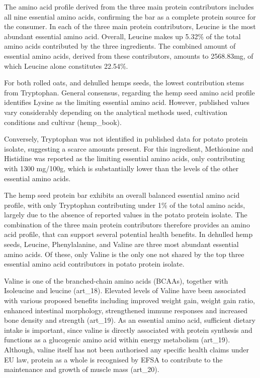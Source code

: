 \vspace{1em}
The amino acid profile derived from the three main protein contributors includes all nine essential amino acids, confirming the bar as a complete protein source for the consumer. In each of the three main protein contributors, Leucine is the most abundant essential amino acid. Overall, Leucine makes up 5.32\% of the total amino acids contributed by the three ingredients. The combined amount of essential amino acids, derived from these contributors, amounts to 2568.83mg, of which Leucine alone constitutes 22.54\%.

\vspace{1em}
For both rolled oats, and dehulled hemps seeds, the lowest contribution stems from Tryptophan. General consensus, regarding the hemp seed amino acid profile identifies Lysine as the limiting essential amino acid. However, published values vary considerably depending on the analytical methods used, cultivation conditions and cultivar (hemp\_book). 

\vspace{1em}
Conversely, Tryptophan was not identified in published data for potato protein isolate, suggesting a scarce amounts present. For this ingredient, Methionine and Histidine was reported as the limiting essential amino acids, only contributing with 1300 mg/100g, which is substantially lower than the levels of the other essential amino acids. 

\vspace{1em}
The hemp seed protein bar exhibits an overall balanced essential amino acid profile, with only Tryptophan contributing under 1\% of the total amino acids, largely due to the absence of reported values in the potato protein isolate. The combination of the three main protein contributors therefore provides an amino acid profile, that can support several potential health benefits. In dehulled hemp seeds, Leucine, Phenylalanine, and Valine are three most abundant essential amino acids. Of these, only Valine is the only one not shared by the top three essential amino acid contributors in potato protein isolate. 

\vspace{1em}
Valine is one of the branched-chain amino acids (BCAAs), together with Isoleucine and leucine (art\_18). Elevated levels of Valine have been associated with various proposed benefits including improved weight gain, weight gain ratio, enhanced intestinal morphology, strengthened immune responses and increased bone density and strength (art\_19). As an essential amino acid, sufficient dietary intake is important, since valine is directly associated with protein synthesis and functions as a glucogenic amino acid within energy metabolism (art\_19). Although, valine itself has not been authorised any specific health claims under EU law, protein as a whole is recognised by EFSA to contribute to the maintenance and growth of muscle mass (art\_20).

